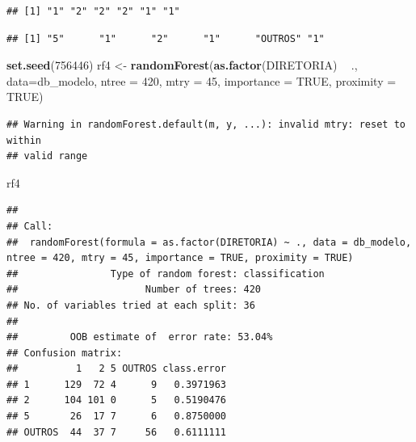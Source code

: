 \documentclass[]{article}
\newenvironment{Shaded}{\begin{snugshade}}{\end{snugshade}}
\newcommand{\DataTypeTok}[1]{\textcolor[rgb]{0.13,0.29,0.53}{#1}}
\newcommand{\DecValTok}[1]{\textcolor[rgb]{0.00,0.00,0.81}{#1}}
\newcommand{\KeywordTok}[1]{\textcolor[rgb]{0.13,0.29,0.53}{\textbf{#1}}}
\newcommand{\NormalTok}[1]{#1}
\newcommand{\OperatorTok}[1]{\textcolor[rgb]{0.81,0.36,0.00}{\textbf{#1}}}
\newcommand{\OtherTok}[1]{\textcolor[rgb]{0.56,0.35,0.01}{#1}}
\newcommand{\StringTok}[1]{\textcolor[rgb]{0.31,0.60,0.02}{#1}}
\begin{document}
\begin{verbatim}
## [1] "1" "2" "2" "2" "1" "1"
\end{verbatim}

\begin{Shaded}
\end{Shaded}

\begin{verbatim}
## [1] "5"      "1"      "2"      "1"      "OUTROS" "1"
\end{verbatim}

\begin{Shaded}
\begin{Highlighting}[]
\KeywordTok{set.seed}\NormalTok{(}\DecValTok{756446}\NormalTok{)}
\NormalTok{rf4 <-}\StringTok{ }\KeywordTok{randomForest}\NormalTok{(}\KeywordTok{as.factor}\NormalTok{(DIRETORIA) }\OperatorTok{~}\StringTok{ }\NormalTok{., }\DataTypeTok{data=}\NormalTok{db_modelo,}
                    \DataTypeTok{ntree =} \DecValTok{420}\NormalTok{,}
                    \DataTypeTok{mtry =} \DecValTok{45}\NormalTok{,}
                    \DataTypeTok{importance =} \OtherTok{TRUE}\NormalTok{,}
                    \DataTypeTok{proximity =} \OtherTok{TRUE}\NormalTok{)}
\end{Highlighting}
\end{Shaded}

\begin{verbatim}
## Warning in randomForest.default(m, y, ...): invalid mtry: reset to within
## valid range
\end{verbatim}

\begin{Shaded}
\begin{Highlighting}[]
\NormalTok{rf4}
\end{Highlighting}
\end{Shaded}

\begin{verbatim}
## 
## Call:
##  randomForest(formula = as.factor(DIRETORIA) ~ ., data = db_modelo,      ntree = 420, mtry = 45, importance = TRUE, proximity = TRUE) 
##                Type of random forest: classification
##                      Number of trees: 420
## No. of variables tried at each split: 36
## 
##         OOB estimate of  error rate: 53.04%
## Confusion matrix:
##          1   2 5 OUTROS class.error
## 1      129  72 4      9   0.3971963
## 2      104 101 0      5   0.5190476
## 5       26  17 7      6   0.8750000
## OUTROS  44  37 7     56   0.6111111
\end{verbatim}
\end{document}
